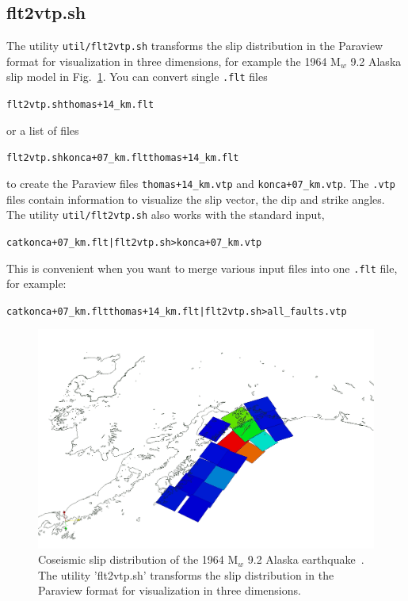 \documentclass[10pt]{article}
\begin{document}
\subsection{flt2vtp.sh}
The utility \verb'util/flt2vtp.sh' transforms the slip distribution in the Paraview format for visualization in three dimensions, for example the 1964 M$_w$ 9.2 Alaska slip model in Fig.~\ref{fig:alaska}. You can convert single \verb'.flt' files
\begin{alltt}
{\color{NavyBlue}flt2vtp.sh thomas+14_km.flt}
\end{alltt}
or a list of files
\begin{alltt}
{\color{NavyBlue}flt2vtp.sh konca+07_km.flt thomas+14_km.flt}
\end{alltt}
to create the Paraview files \verb'thomas+14_km.vtp' and \verb'konca+07_km.vtp'. The \verb'.vtp' files contain information to visualize the slip vector, the dip and strike angles. The utility \verb'util/flt2vtp.sh' also works with the standard input, 
\begin{alltt}
{\color{NavyBlue}cat konca+07_km.flt | flt2vtp.sh > konca+07_km.vtp}
\end{alltt}
This is convenient when you want to merge various input files into one \verb'.flt' file, for example:
\begin{alltt}
{\color{NavyBlue}cat konca+07_km.flt thomas+14_km.flt | flt2vtp.sh > all_faults.vtp}
\end{alltt}

%
\begin{figure}[h]
\centering
\includegraphics[width=\textwidth]{alaska.jpg}
\caption{\small Coseismic slip distribution of the 1964 M$_w$ 9.2 Alaska earthquake~\citep{johnson+96}. The utility 'flt2vtp.sh' transforms the slip distribution in the Paraview format for visualization in three dimensions.}
\label{fig:alaska}
\end{figure}
%
\end{document}
